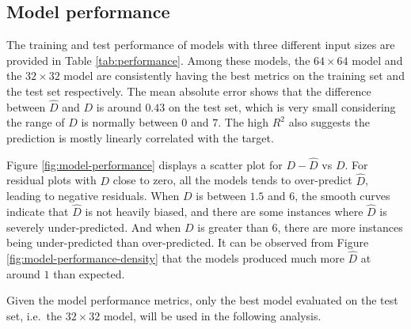 \documentclass[]{interact}
\theoremstyle{plain}%
\theoremstyle{definition}
\theoremstyle{remark}
\begin{document}
\hypertarget{model-performance}{%
\subsection{Model performance}\label{model-performance}}

The training and test performance of models with three different input
sizes are provided in Table \ref{tab:performance}. Among these models,
the \(64 \times 64\) model and the \(32 \times 32\) model are
consistently having the best metrics on the training set and the test
set respectively. The mean absolute error shows that the difference
between \(\hat{D}\) and \(D\) is around \(0.43\) on the test set, which
is very small considering the range of \(D\) is normally between \(0\)
and \(7\). The high \(R^2\) also suggests the prediction is mostly
linearly correlated with the target.

Figure \ref{fig:model-performance} displays a scatter plot for
\(D - \hat{D}\) vs \(D\). For residual plots with \(D\) close to zero,
all the models tends to over-predict \(\hat{D}\), leading to negative
residuals. When \(D\) is between \(1.5\) and \(6\), the smooth curves
indicate that \(\hat{D}\) is not heavily biased, and there are some
instances where \(\hat{D}\) is severely under-predicted. And when \(D\)
is greater than \(6\), there are more instances being under-predicted
than over-predicted. It can be observed from Figure
\ref{fig:model-performance-density} that the models produced much more
\(\hat{D}\) at around \(1\) than expected.

Given the model performance metrics, only the best model evaluated on
the test set, i.e.~the \(32 \times 32\) model, will be used in the
following analysis.
\end{document}
